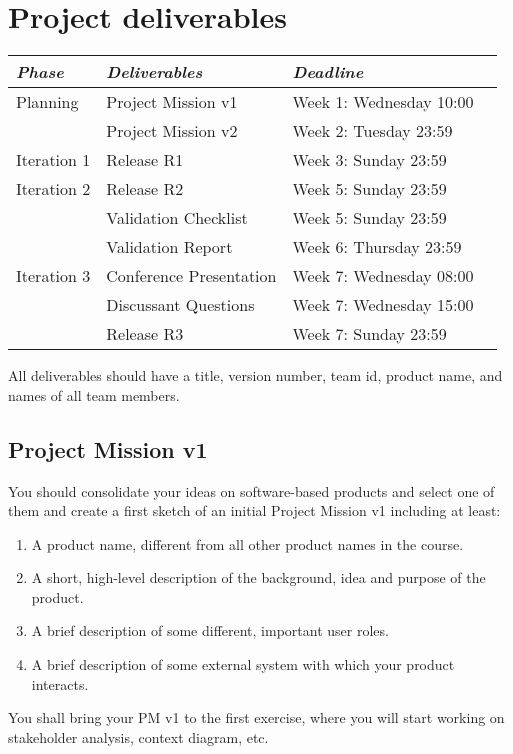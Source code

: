 \documentclass{project}
\begin{document}
\section{Project deliverables}
\begin{tabular}{l |l p{5cm}  l}
{\it Phase} & {\it Deliverables} & {\it Deadline} \\
\hline
Planning & Project Mission v1& Week 1: Wednesday 10:00\\
         & Project Mission v2& Week 2: Tuesday 23:59\\
Iteration 1 & Release R1 & Week 3: Sunday 23:59 \\
Iteration 2 & Release R2  & Week 5: Sunday 23:59\\
            & Validation Checklist & Week 5: Sunday 23:59\\
            & Validation Report & Week 6: Thursday 23:59\\
            Iteration 3 & Conference Presentation & Week 7: Wednesday 08:00\\
            & Discussant Questions & Week 7: Wednesday 15:00\\
            & Release R3 & Week 7: Sunday 23:59\\
      
\end{tabular}
\vskip3mm

\noindent All deliverables should have a title, version number, team id, product name, and names of all team members. 

\subsection{Project Mission v1}

You should consolidate your ideas on software-based products and select one of them and create a first sketch of an initial Project Mission v1 including at least:
\begin{enumerate}[noitemsep]
  \item A product name, different from all other product names in the course. 
  \item A short, high-level description of the background, idea and purpose of the product. 
  \item A brief description of some different, important user roles.
  \item A brief description of some external system with which your product interacts.
\end{enumerate}
You shall bring your PM v1 to the first exercise, where you will start working on stakeholder analysis, context diagram, etc.
\end{document}
